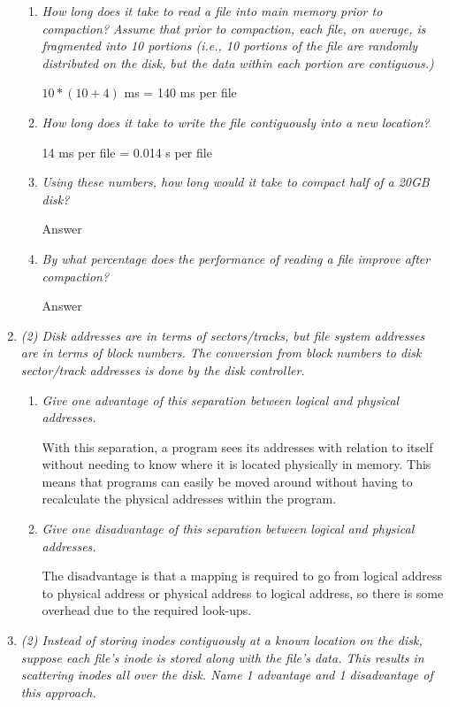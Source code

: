 \documentclass[letterpaper,11pt]{article}
\begin{document}
\begin{enumerate}
    \begin{enumerate}
    \item \emph{How long does it take to read a file into main memory prior to compaction? Assume that prior to compaction, each file, on average, is fragmented into 10 portions (i.e., 10 portions of the file are randomly distributed on the disk, but the data within each portion are contiguous.)}
    
    $10 * (10 + 4)$ ms = 140 ms per file
    \item \emph{How long does it take to write the file contiguously into a new location?}
    
    14 ms per file = 0.014 s per file
    \item \emph{Using these numbers, how long would it take to compact half of a 20GB disk?}
    
    Answer
    \item \emph{By what percentage does the performance of reading a file improve after compaction?}
    
    Answer
    \end{enumerate}

\item \emph{(2) Disk addresses are in terms of sectors/tracks, but file system addresses are in terms of block numbers. The conversion from block numbers to disk sector/track addresses is done by the disk controller.}

    \begin{enumerate}
    \item \emph{Give one advantage of this separation between logical and physical addresses.}
    
    With this separation, a program sees its addresses with relation to itself without needing to know where it is located physically in memory.  This means that programs can easily be moved around without having to recalculate the physical addresses within the program.
    \item \emph{Give one disadvantage of this separation between logical and physical addresses.}
    
    The disadvantage is that a mapping is required to go from logical address to physical address or physical address to logical address, so there is some overhead due to the required look-ups.
    \end{enumerate}
    
\item \emph{(2) Instead of storing inodes contiguously at a known location on the disk, suppose each file's inode is stored along with the file's data. This results in scattering inodes all over the disk. Name 1 advantage and 1 disadvantage of this approach.}
    

\end{enumerate}
\end{document}
